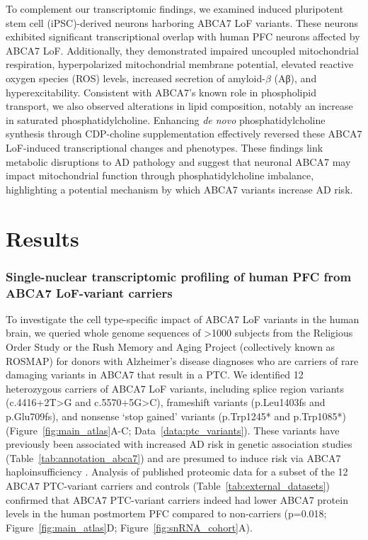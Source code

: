 \documentclass[12pt]{article}
\begin{document}
To complement our transcriptomic findings, we examined induced pluripotent stem cell (iPSC)-derived neurons harboring ABCA7 LoF variants. These neurons exhibited significant transcriptional overlap with human PFC neurons affected by ABCA7 LoF. Additionally, they demonstrated impaired uncoupled mitochondrial respiration, hyperpolarized mitochondrial membrane potential, elevated reactive oxygen species (ROS) levels, increased secretion of amyloid-$\beta$ (Aβ), and hyperexcitability. Consistent with ABCA7's known role in phospholipid transport, we also observed alterations in lipid composition, notably an increase in saturated phosphatidylcholine. Enhancing \textit{de novo} phosphatidylcholine synthesis through CDP-choline supplementation effectively reversed these ABCA7 LoF-induced transcriptional changes and phenotypes. These findings link metabolic disruptions to AD pathology and suggest that neuronal ABCA7 may impact mitochondrial function through phosphatidylcholine imbalance, highlighting a potential mechanism by which ABCA7 variants increase AD risk.
 
\section{Results}
\label{sec:results}
\subsubsection{Single-nuclear transcriptomic profiling of human PFC from ABCA7 LoF-variant carriers} 
To investigate the cell type-specific impact of ABCA7 LoF variants in the human brain, we queried whole genome sequences of >1000 subjects from the Religious Order Study or the Rush Memory and Aging Project (collectively known as ROSMAP) for donors with Alzheimer’s disease diagnoses who are carriers of rare damaging variants in ABCA7 that result in a PTC. We identified 12 heterozygous carriers of ABCA7 LoF variants, including splice region variants (c.4416+2T>G and c.5570+5G>C), frameshift variants (p.Leu1403fs and p.Glu709fs), and nonsense ‘stop gained’ variants (p.Trp1245* and p.Trp1085*) (Figure~\ref{fig:main_atlas}A-C; Data~\ref{data:ptc_variants}). These variants have previously been associated with increased AD risk in genetic association studies (Table~\ref{tab:annotation_abca7}) \cite{Steinberg2015-mu,Holstege2022-vp} and are presumed to induce risk via ABCA7 haploinsufficiency \cite{Duchateau2024-rf}. Analysis of published proteomic data for a subset of the 12 ABCA7 PTC-variant carriers and controls \cite{Johnson2020-ip} (Table~\ref{tab:external_datasets}) confirmed that ABCA7 PTC-variant carriers indeed had lower ABCA7 protein levels in the human postmortem PFC compared to non-carriers (p=0.018; Figure~\ref{fig:main_atlas}D; Figure~\ref{fig:snRNA_cohort}A). 
\end{document}
